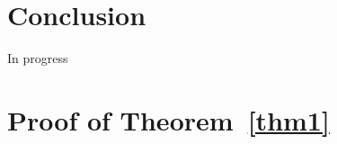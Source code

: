 \documentclass[a4paper,11pt]{article}
\begin{document}
\section{Conclusion}
{\color{red}In progress}
\newpage
\appendix
\section{Proof of Theorem~\ref{thm1}}\label{app.proofthm1}
\end{document}
